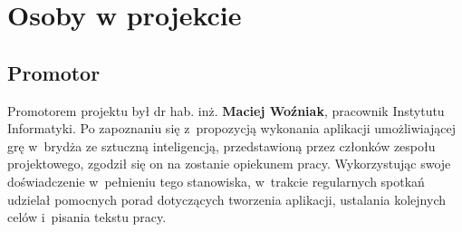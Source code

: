 

\section{Osoby w projekcie}

\subsection{Promotor}

Promotorem projektu był dr hab. inż. \textbf{Maciej Woźniak}, pracownik Instytutu Informatyki.
Po zapoznaniu się z~propozycją wykonania aplikacji umożliwiającej grę w~brydża ze sztuczną
inteligencją, przedstawioną przez członków zespołu projektowego, zgodził się on na zostanie
opiekunem pracy. Wykorzystując swoje doświadczenie w~pełnieniu tego stanowiska, w~trakcie regularnych
spotkań udzielał pomocnych porad dotyczących tworzenia aplikacji, ustalania kolejnych celów
i~pisania tekstu pracy.


